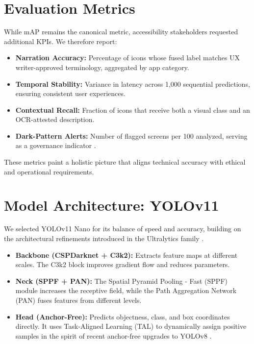 \documentclass[11pt,a4paper]{report}
\begin{document}
\section{Evaluation Metrics}
While mAP remains the canonical metric, accessibility stakeholders requested additional KPIs. We therefore report:
\begin{itemize}
    \item \textbf{Narration Accuracy:} Percentage of icons whose fused label matches UX writer-approved terminology, aggregated by app category.
    \item \textbf{Temporal Stability:} Variance in latency across 1,000 sequential predictions, ensuring consistent user experiences.
    \item \textbf{Contextual Recall:} Fraction of icons that receive both a visual class and an OCR-attested description.
    \item \textbf{Dark-Pattern Alerts:} Number of flagged screens per 100 analyzed, serving as a governance indicator \cite{darkpatterns}.
\end{itemize}
These metrics paint a holistic picture that aligns technical accuracy with ethical and operational requirements.

\section{Model Architecture: YOLOv11}
We selected YOLOv11 Nano for its balance of speed and accuracy, building on the architectural refinements introduced in the Ultralytics family \cite{yolov11}.
\begin{itemize}
    \item \textbf{Backbone (CSPDarknet + C3k2):} Extracts feature maps at different scales. The C3k2 block improves gradient flow and reduces parameters.
    \item \textbf{Neck (SPPF + PAN):} The Spatial Pyramid Pooling - Fast (SPPF) module increases the receptive field, while the Path Aggregation Network (PAN) fuses features from different levels.
    \item \textbf{Head (Anchor-Free):} Predicts objectness, class, and box coordinates directly. It uses Task-Aligned Learning (TAL) to dynamically assign positive samples in the spirit of recent anchor-free upgrades to YOLOv8 \cite{yolov8}.
\end{itemize}
\end{document}
